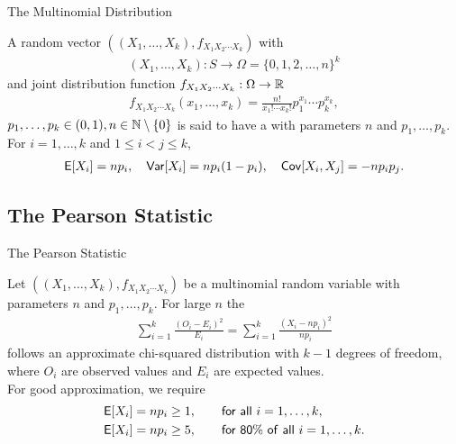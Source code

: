 \begin{frame}{The Multinomial Distribution}

\justifying
{} A random vector $((X_1, \ldots, X_k), f_{X_1X_2\cdots X_k})$ with 
\begin{align*}
(X_1, \ldots, X_k): S\rightarrow \Omega = \{0, 1, 2, \ldots, n\}^k
\end{align*}
and joint distribution function $f_{X_1X_2\cdots X_k}: \Omega\rightarrow\mathbb{R}$
\begin{align*}
f_{X_1X_2\cdots X_k}(x_1, \ldots, x_k) = \frac{n!}{x_1!\cdots x_k!} p_1^{x_1}\cdots p_k^{x_k},
\end{align*}
$p_1,\ldots, p_k\in (0, 1), n\in \mathbb{N}\setminus\{0\}$ is said to have a  with parameters $n$ and $p_1,\ldots, p_k$. For $i = 1,\ldots, k$ and $1\leq i < j\leq k$,
\begin{align*}
\mathsf{E}[X_i] = np_i, \quad \mathsf{Var}[X_i] = np_i(1-p_i), \quad \mathsf{Cov}[X_i, X_j] = -np_ip_j.
\end{align*}

\end{frame}

\subsection{The Pearson Statistic}

\begin{frame}{The Pearson Statistic}

\justifying
{} Let $((X_1, \ldots, X_k), f_{X_1X_2\cdots X_k})$ be a multinomial random variable with parameters $n$ and $p_1, \ldots, p_k$. For large $n$ the 
\begin{align*}
\sum_{i=1}^k \frac{(O_i-E_i)^2}{E_i} = \sum_{i=1}^k \frac{(X_i-np_i)^2}{np_i}
\end{align*}
follows an approximate chi-squared distribution with $k-1$ degrees of freedom, where $O_i$ are observed values and $E_i$ are expected values. \\
 For good approximation, we require
\begin{align*}
\mathsf{E}[X_i] & = np_i \geq 1, \qquad \mathsf{for\ all\ } i = 1, \ldots, k,\\
\mathsf{E}[X_i] & = np_i \geq 5, \qquad \mathsf{for\ 80\%\ of\ all\ } i = 1,\ldots, k.
\end{align*}

\end{frame}

